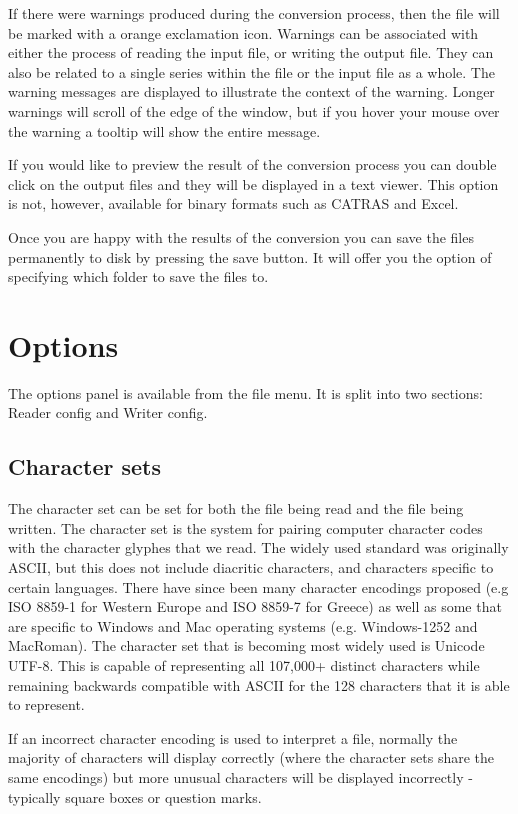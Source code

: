 \documentclass[10pt, headsepline,DIV14,BCOR0.5cm]{scrreprt}
\begin{document}
If there were warnings produced during the conversion process, then the file will be marked with a orange
exclamation icon. Warnings can be associated with either the process of reading the input file, or writing
the output file. They can also be related to a single series within the file or the input file as a whole. The
warning messages are displayed to illustrate the context of the warning. Longer warnings will scroll of the
edge of the window, but if you hover your mouse over the warning a tooltip will show the entire message.

If you would like to preview the result of the conversion process you can double click on the output files
and they will be displayed in a text viewer. This option is not, however, available for binary formats such
as CATRAS and Excel.

Once you are happy with the results of the conversion you can save the files permanently to disk by pressing
the save button. It will offer you the option of specifying which folder to save the files to.


\chapter{Options}

The options panel is available from the file menu. It is split into two sections: Reader config and Writer
config.

\section{Character sets}

The character set can be set for both the file being read and the file being written. The character set is
the system for pairing computer character codes with the character glyphes that we read. The widely
used standard was originally ASCII, but this does not include diacritic characters, and characters specific
to certain languages. There have since been many character encodings proposed (e.g ISO 8859-1 for
Western Europe and ISO 8859-7 for Greece) as well as some that are specific to Windows and Mac
operating systems (e.g. Windows-1252 and MacRoman). The character set that is becoming most widely
used is Unicode UTF-8. This is capable of representing all 107,000+ distinct characters while remaining
backwards compatible with ASCII for the 128 characters that it is able to represent.

If an incorrect character encoding is used to interpret a file, normally the majority of characters will display
correctly (where the character sets share the same encodings) but more unusual characters will be displayed
incorrectly - typically square boxes or question marks.
\end{document}
